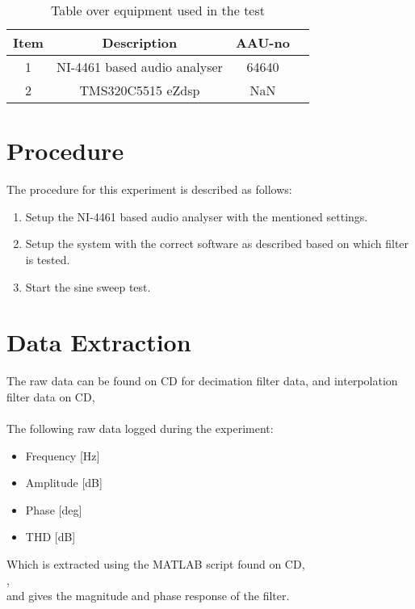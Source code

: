 \begin{table}[H]
\centering
{}
\begin{tabular}{S[table-format=1]ccc} \toprule
    {Item} & {Description} & {AAU-no} \\       &  NI-4461 based audio analyser  & 64640  \\ 
    2      &  TMS320C5515 eZdsp  & NaN  \\  \bottomrule 
\end{tabular}
\caption{Table over equipment used in the test}
\label{tab:UsedEquipmentDecimation}
\end{table}
\vspace{-5mm}


\section{Procedure}
The procedure for this experiment is described as follows:
\vspace{-5mm}
\begin{enumerate}\addtolength{\itemsep}{-.35\baselineskip} 
\item Setup the NI-4461 based audio analyser with the mentioned settings.
\item Setup the system with the correct software as described based on which filter is tested.
\item Start the sine sweep test.
\end{enumerate}

\section{Data Extraction}
The raw data can be found on CD for decimation filter data, and interpolation filter data on CD, \\
   \\ 
The following raw data logged during the experiment:
\vspace{-5mm}
\begin{itemize}\addtolength{\itemsep}{-.35\baselineskip} 
\item Frequency [Hz]
\item Amplitude [dB]
\item Phase 	[deg]
\item THD 		[dB]
\end{itemize} 
Which is extracted using the MATLAB script found on CD, \\
,  \\
and gives the magnitude and phase response of the filter.
